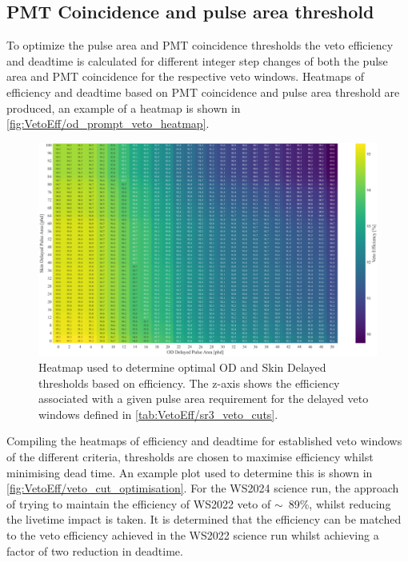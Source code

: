 \subsection{PMT Coincidence and pulse area threshold}
To optimize the pulse area and PMT coincidence thresholds the veto efficiency and deadtime is calculated for different integer step changes of both the pulse area and PMT coincidence for the respective veto windows. Heatmaps of efficiency and deadtime based on PMT coincidence and pulse area threshold are produced, an example of a heatmap is shown in \autoref{fig:VetoEff/od_prompt_veto_heatmap}. %

\begin{figure}
	\centering
	\includegraphics[width=\textwidth]{figures/VetoEfficiency/Heatmap600us_ODDelayedSkinDelayedThresholds.png}
	\caption{Heatmap used to determine optimal OD and Skin Delayed thresholds based on efficiency. The z-axis shows the efficiency associated with a given pulse area requirement for the delayed veto windows defined in \autoref{tab:VetoEff/sr3_veto_cuts}.}
	\label{fig:VetoEff/od_prompt_veto_heatmap}
\end{figure}

Compiling the heatmaps of efficiency and deadtime for established veto windows of the different criteria, thresholds are chosen to maximise efficiency whilst minimising dead time. An example plot used to determine this is shown in \autoref{fig:VetoEff/veto_cut_optimisation}.
For the WS2024 science run, the approach of trying to maintain the efficiency of WS2022 veto of $\sim$~89\%, whilst reducing the livetime impact is taken. It is determined that the efficiency can be matched to the veto efficiency achieved in the WS2022 science run whilst achieving a factor of two reduction in deadtime.

